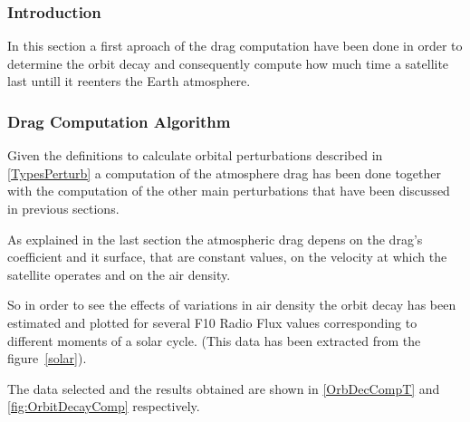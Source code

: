 \subsubsection{Introduction}

In this section a first aproach of the drag computation have been done in order to determine the orbit decay and consequently compute how much time a satellite last untill it reenters the Earth atmosphere.

\subsubsection{Drag Computation Algorithm}

Given the definitions to calculate orbital perturbations described in \ref{TypesPerturb} a computation of the atmosphere drag has been done together with the computation of the other main perturbations that have been discussed in previous sections.

As explained in the last section the atmospheric drag depens on the drag's coefficient and it surface, that are constant values, on the velocity at which the satellite operates and on the air density.

So in order to see the effects of variations in air density the orbit decay has been estimated and plotted for several F10 Radio Flux values corresponding to different moments of a solar cycle. (This data has been extracted from the figure~\ref{solar}).

The data selected and the results obtained are shown in \ref{OrbDecCompT} and \ref{fig:OrbitDecayComp} respectively.



